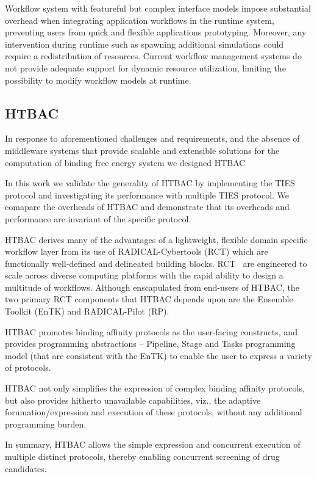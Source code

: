Workflow system with featureful but complex interface models impose
substantial overhead when integrating application workflows in the runtime
system, preventing users from quick and flexible applications prototyping.
Moreover, any intervention during runtime such as spawning additional
simulations could require a redistribution of resources. Current workflow
management systems do not provide adequate support for dynamic resource
utilization, limiting the possibility to modify workflow models at runtime.



\subsection{HTBAC}

In response to aforementioned challenges and requirements, and the absence of
middleware systems that provide scalable and extensible solutions for the
computation of binding free energy system we designed HTBAC

In this work we validate the generality of HTBAC by implementing the TIES
protocol and investigating its performance with multiple TIES protocol. We
comapare the overheads of HTBAC and demonstrate that its overheads and
performance are invariant of the specific protocol.

HTBAC derives many of the advantages of a lightweight, flexible domain
specific workflow layer from its use of RADICAL-Cybertools (RCT) which are
functionally well-defined and delineated building blocks.
RCT~\cite{review_bb_2016} are engineered to scale across diverse computing
platforms with the rapid ability to design a multitude of workflows. Although
enscapulated from end-users of HTBAC, the two primary RCT components that
HTBAC depends upon are the Ensemble Toolkit (EnTK) and RADICAL-Pilot (RP).

HTBAC promotes binding affinity protocols as the user-facing constructs, and
provides programming abstractions -- Pipeline, Stage and Tasks programming
model (that are consistent with the EnTK) to enable the user to express a
variety of protocols.

HTBAC not only simplifies the expression of complex binding affinity protocols, 
but also provides hitherto unavailable capabilities, viz., the adaptive
forumation/expression and execution of these protocols, without any additional 
programming burden.

In summary, HTBAC allows the simple expression and concurrent execution of
multiple distinct protocols, thereby enabling concurrent screening of drug
candidates.

